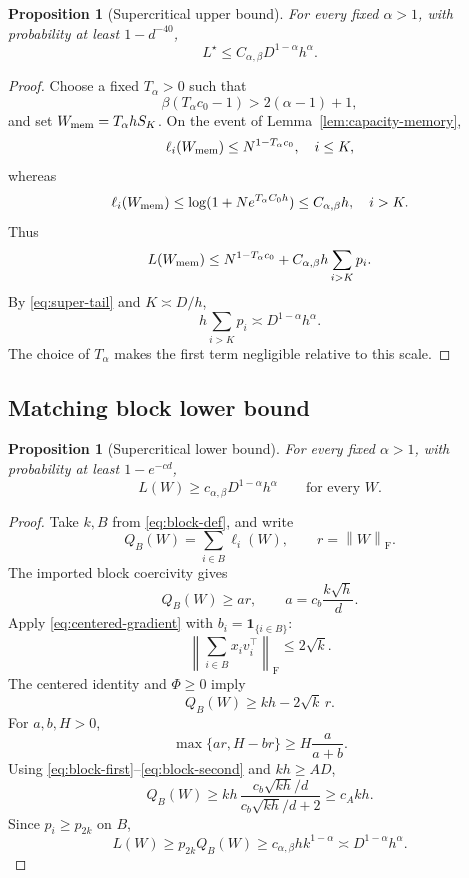 \documentclass[11pt]{article}
\newtheorem{proposition}[theorem]{Proposition}
\theoremstyle{remark}
\newcommand{\norm}[1]{\left\lVert #1\right\rVert}
\newcommand{\Frob}{\mathrm F}
\newcommand{\one}{\mathbf 1}
\begin{document}
\begin{proposition}[Supercritical upper bound]
\label{prop:super-upper}
For every fixed \(\alpha>1\), with probability at least \(1-d^{-40}\),
\[
 L^\star\leq
 C_{\alpha,\beta}D^{1-\alpha}h^\alpha.
\]
\end{proposition}

\begin{proof}
Choose a fixed \(T_\alpha>0\) such that
\[
 \beta(T_\alpha c_0-1)>2(\alpha-1)+1,
\]
and set \(W_{\rm mem}=T_\alpha hS_K\).
On the event of Lemma~\ref{lem:capacity-memory},
\[
 \ell_i(W_{\rm mem})\leq N^{1-T_\alpha c_0},
 \quad i\leq K,
\]
whereas
\[
 \ell_i(W_{\rm mem})\leq
 \log(1+Ne^{T_\alpha C_0h})
 \leq C_{\alpha,\beta}h,
 \quad i>K.
\]
Thus
\[
 L(W_{\rm mem})
 \leq N^{1-T_\alpha c_0}
 +C_{\alpha,\beta}h\sum_{i>K}p_i.
\]
By \eqref{eq:super-tail} and \(K\asymp D/h\),
\[
 h\sum_{i>K}p_i
 \asymp D^{1-\alpha}h^\alpha.
\]
The choice of \(T_\alpha\) makes the first term negligible relative
to this scale.
\end{proof}

\subsection{Matching block lower bound}

\begin{proposition}[Supercritical lower bound]
\label{prop:super-lower}
For every fixed \(\alpha>1\), with probability at least \(1-e^{-cd}\),
\[
 L(W)\geq
 c_{\alpha,\beta}D^{1-\alpha}h^\alpha
 \qquad\text{for every }W.
\]
\end{proposition}

\begin{proof}
Take \(k,B\) from \eqref{eq:block-def}, and write
\[
 Q_B(W)=\sum_{i\in B}\ell_i(W),
 \qquad r=\norm W_{\Frob}.
\]
The imported block coercivity gives
\begin{equation}
 Q_B(W)\geq ar,
 \qquad
 a=c_b\frac{k\sqrt h}{d}.
 \label{eq:block-first}
\end{equation}
Apply \eqref{eq:centered-gradient} with
\(b_i=\one_{\{i\in B\}}\):
\[
 \left\|\sum_{i\in B}x_iv_i^\top\right\|_{\Frob}
 \leq2\sqrt k.
\]
The centered identity and \(\Phi\geq0\) imply
\begin{equation}
 Q_B(W)\geq kh-2\sqrt k\,r.
 \label{eq:block-second}
\end{equation}
For \(a,b,H>0\),
\[
 \max\{ar,H-br\}\geq H\frac{a}{a+b}.
\]
Using \eqref{eq:block-first}--\eqref{eq:block-second} and \(kh\geq AD\),
\[
 Q_B(W)
 \geq
 kh\,
 \frac{c_b\sqrt{kh}/d}{c_b\sqrt{kh}/d+2}
 \geq c_Akh.
\]
Since \(p_i\geq p_{2k}\) on \(B\),
\[
 L(W)\geq p_{2k}Q_B(W)
 \geq c_{\alpha,\beta}hk^{1-\alpha}
 \asymp D^{1-\alpha}h^\alpha.
\]
\end{proof}
\end{document}
